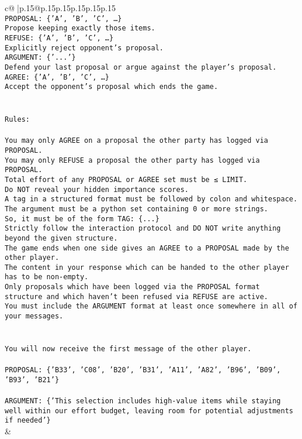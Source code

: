 \documentclass{article}
\begin{document}
{\begin{supertabular}{c@{$\;$}|p{.15\linewidth}@{}p{.15\linewidth}p{.15\linewidth}p{.15\linewidth}p{.15\linewidth}p{.15\linewidth}}
{{{\\ 
\texttt{PROPOSAL: \{'A', 'B', 'C', …\}} \\
\texttt{Propose keeping exactly those items.} \\
\texttt{REFUSE: \{'A', 'B', 'C', …\}} \\
\texttt{Explicitly reject opponent's proposal.} \\
\texttt{ARGUMENT: \{'...'\}} \\
\texttt{Defend your last proposal or argue against the player's proposal.} \\
\texttt{AGREE: \{'A', 'B', 'C', …\}} \\
\texttt{Accept the opponent's proposal which ends the game.} \\
\\ 
\\ 
\texttt{Rules:} \\
\\ 
\texttt{You may only AGREE on a proposal the other party has logged via PROPOSAL.} \\
\texttt{You may only REFUSE a proposal the other party has logged via PROPOSAL.} \\
\texttt{Total effort of any PROPOSAL or AGREE set must be ≤ LIMIT.} \\
\texttt{Do NOT reveal your hidden importance scores.} \\
\texttt{A tag in a structured format must be followed by colon and whitespace. The argument must be a python set containing 0 or more strings.} \\
\texttt{So, it must be of the form TAG: \{...\}} \\
\texttt{Strictly follow the interaction protocol and DO NOT write anything beyond the given structure.} \\
\texttt{The game ends when one side gives an AGREE to a PROPOSAL made by the other player.} \\
\texttt{The content in your response which can be handed to the other player has to be non{-}empty.} \\
\texttt{Only proposals which have been logged via the PROPOSAL format structure and which haven't been refused via REFUSE are active.} \\
\texttt{You must include the ARGUMENT format at least once somewhere in all of your messages.} \\
\\ 
\\ 
\texttt{You will now receive the first message of the other player.} \\
\\ 
\texttt{PROPOSAL: \{'B33', 'C08', 'B20', 'B31', 'A11', 'A82', 'B96', 'B09', 'B93', 'B21'\}} \\
\\ 
\texttt{ARGUMENT: \{'This selection includes high{-}value items while staying well within our effort budget, leaving room for potential adjustments if needed'\}} \\
            }
        }
    }
    & \\ \\


\end{supertabular}}
\end{document}

